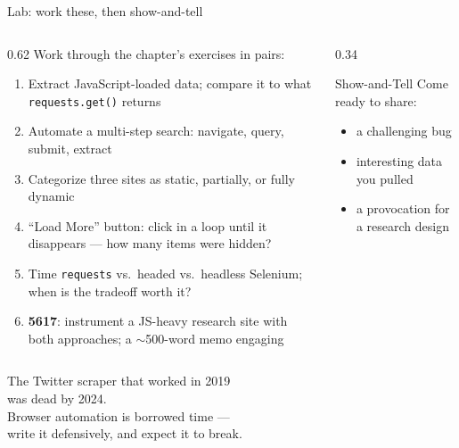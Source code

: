 \documentclass[9pt,aspectratio=169]{beamer}
\begin{document}
\begin{frame}{Lab: work these, then show-and-tell}
    \begin{columns}[T]
        \begin{column}{0.62\textwidth}
            Work through the chapter's exercises in pairs:
            \begin{enumerate}\small
                \item Extract JavaScript-loaded data; compare it to what \texttt{requests.get()} returns
                \item Automate a multi-step search: navigate, query, submit, extract
                \item Categorize three sites as static, partially, or fully dynamic
                \item ``Load More'' button: click in a loop until it disappears --- how many items were hidden?
                \item Time \texttt{requests} vs.\ headed vs.\ headless Selenium; when is the tradeoff worth it?
                \item[6.] \textcolor{tab-purple}{\textbf{5617}}: instrument a JS-heavy research site with both approaches; a $\sim$500-word memo engaging \textcite{mitchell2018web}
            \end{enumerate}
        \end{column}
        \begin{column}{0.34\textwidth}
            \begin{block}{Show-and-Tell}
                \footnotesize Come ready to share:
                \begin{itemize}\footnotesize
                    \item a challenging bug
                    \item interesting data you pulled
                    \item a provocation for a research design
                \end{itemize}
            \end{block}
        \end{column}
    \end{columns}
\end{frame}

\begin{frame}[standout]
    The Twitter scraper that worked in 2019\\
    was dead by 2024.\\[1em]
    Browser automation is borrowed time ---\\
    {\large write it defensively, and expect it to break.}
\end{frame}
\end{document}
